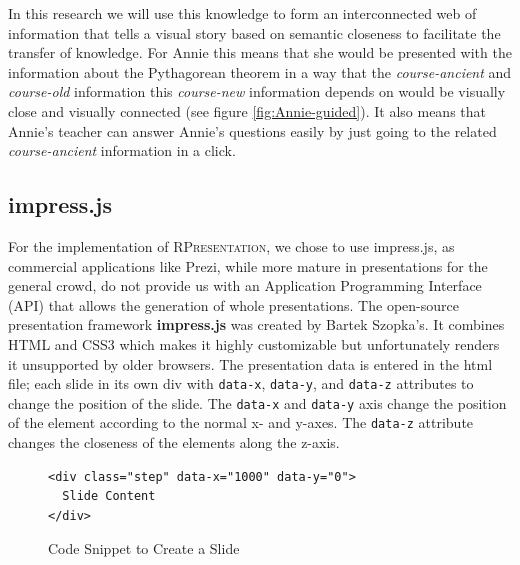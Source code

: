\documentclass[twoside, 12pt]{article}
\newcommand{\sys}{\textsc{RPresentation}\xspace}
\begin{document}
In this research we will use this knowledge to form an interconnected web of information that tells a visual story based on semantic closeness to facilitate the transfer of knowledge. For Annie this means that she would be presented with the information about the Pythagorean theorem in a way that the \textit{course-ancient} and \textit{course-old} information this \textit{course-new} information depends on would be visually close and visually connected (see figure \ref{fig:Annie-guided}). It also means that Annie's teacher can answer Annie's questions easily by just going to the related \textit{course-ancient} information in a click.\\

\subsection{impress.js}
\label{sec:Impressjs}

For the implementation of \sys, we chose to use impress.js, as commercial applications like Prezi, while more mature in presentations for the general crowd, do not provide us with an Application Programming Interface (API) that allows the generation of whole presentations. The open-source presentation framework \textbf{impress.js} \cite{JSImpress:npentrel14} was created by Bartek Szopka's. It combines HTML and CSS3 which makes it highly customizable but unfortunately renders it unsupported by older browsers. The presentation data is entered in the html file; each slide in its own div with \texttt{data-x}, \texttt{data-y}, and \texttt{data-z} attributes to change the position of the slide. The \texttt{data-x} and \texttt{data-y} axis change the position of the element according to the normal x- and y-axes. The \texttt{data-z} attribute changes the closeness of the elements along the z-axis.\\

\begin{figure}
\vspace{-26pt}
\begin{verbatim}
<div class="step" data-x="1000" data-y="0">
  Slide Content
</div>
\end{verbatim}
\vspace{-5pt}
  \caption{Code Snippet to Create a Slide}
  \label{fig:SSlide}
  \vspace{12pt}
\end{figure}
\end{document}
